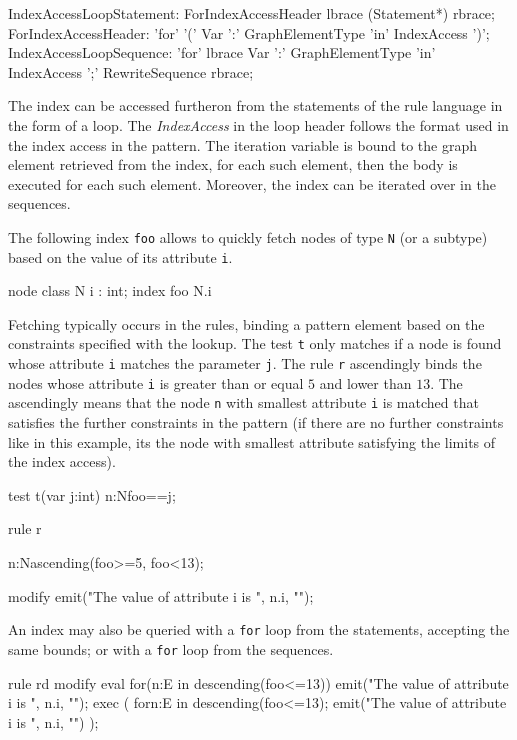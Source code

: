 \begin{rail}
  IndexAccessLoopStatement:
    ForIndexAccessHeader lbrace (Statement*) rbrace;
  ForIndexAccessHeader:
    'for' '(' Var ':' GraphElementType 'in' IndexAccess ')';
  IndexAccessLoopSequence:
    'for' lbrace Var ':' GraphElementType 'in' IndexAccess ';' RewriteSequence rbrace;
\end{rail}

The index can be accessed furtheron from the statements of the rule language in the form of a loop.
The \emph{IndexAccess} in the loop header follows the format used in the index access in the pattern.
The iteration variable is bound to the graph element retrieved from the index, for each such element, then the body is executed for each such element.
Moreover, the index can be iterated over in the sequences.

\begin{example}
The following index \texttt{foo} allows to quickly fetch nodes of type \texttt{N} (or a subtype) based on the value of its attribute \texttt{i}.

\begin{grgen}
node class N {
  i : int;
}
index foo { N.i }
\end{grgen}

Fetching typically occurs in the rules, binding a pattern element based on the constraints specified with the lookup.
The test \texttt{t} only matches if a node is found whose attribute \texttt{i} matches the parameter \texttt{j}.
The rule \texttt{r} ascendingly binds the nodes whose attribute \texttt{i} is greater than or equal $5$ and lower than $13$.
The ascendingly means that the node \texttt{n} with smallest attribute \texttt{i} is matched that satisfies the further constraints in the pattern (if there are no further constraints like in this example, its the node with smallest attribute satisfying the limits of the index access).

\begin{grgen}
test t(var j:int) {
  n:N{foo==j};	
}

rule r {
  n:N{ascending(foo>=5, foo<13)};

  modify {
    emit("The value of attribute i is ", n.i, "\n");
  }
}
\end{grgen}

An index may also be queried with a \texttt{for} loop from the statements, accepting the same bounds; 
or with a \texttt{for} loop from the sequences.

\begin{grgen}
rule rd {
  modify {
    eval {
      for(n:E in {descending(foo<=13)}) {
        emit("The value of attribute i is ", n.i, "\n");
      }
    }
    exec (
      for{n:E in {descending(foo<=13)}; {emit("The value of attribute i is ", n.i, "\n")} }
    );
  }
}
\end{grgen}

\end{example}

